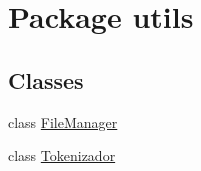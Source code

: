 \hypertarget{namespaceutils}{}\section{Package utils}
\label{namespaceutils}
\subsection*{Classes}
\begin{DoxyCompactItemize}
\item 
class \hyperlink{classutils_1_1_file_manager}{File\+Manager}
\item 
class \hyperlink{classutils_1_1_tokenizador}{Tokenizador}
\end{DoxyCompactItemize}
